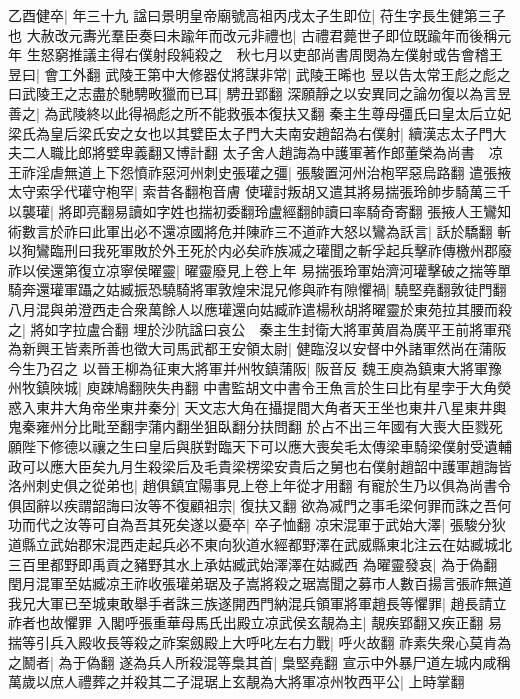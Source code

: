 乙酉健卒|{
	年三十九}
諡曰景明皇帝廟號高祖丙戌太子生即位|{
	苻生字長生健第三子也}
大赦改元夀光羣臣奏曰未踰年而改元非禮也|{
	古禮君薨世子即位既踰年而後稱元年}
生怒窮推議主得右僕射段純殺之　秋七月以吏部尚書周閔為左僕射或告會稽王昱曰|{
	會工外翻}
武陵王第中大修器仗將謀非常|{
	武陵王晞也}
昱以告太常王彪之彪之曰武陵王之志盡於馳騁畋獵而已耳|{
	騁丑郢翻}
深願靜之以安異同之論勿復以為言昱善之|{
	為武陵終以此得禍彪之所不能救張本復扶又翻}
秦主生尊母彊氏曰皇太后立妃梁氏為皇后梁氏安之女也以其嬖臣太子門大夫南安趙韶為右僕射|{
	續漢志太子門大夫二人職比郎將嬖卑義翻又博計翻}
太子舍人趙誨為中護軍著作郎董榮為尚書　凉王祚淫虐無道上下怨憤祚惡河州刺史張瓘之彊|{
	張駿置河州治枹罕惡烏路翻}
遣張掖太守索孚代瓘守枹罕|{
	索昔各翻枹音膚}
使瓘討叛胡又遣其將易揣張玲帥步騎萬三千以襲瓘|{
	將即亮翻易讀如字姓也揣初委翻玲盧經翻帥讀曰率騎奇寄翻}
張掖人王鸞知術數言於祚曰此軍出必不還凉國將危并陳祚三不道祚大怒以鸞為訞言|{
	訞於驕翻}
斬以狥鸞臨刑曰我死軍敗於外王死於内必矣祚族㓕之瓘聞之斬孚起兵擊祚傳檄州郡廢祚以侯還第復立凉寧侯曜靈|{
	曜靈廢見上卷上年}
易揣張玲軍始濟河瓘擊破之揣等單騎奔還瓘軍躡之姑臧振恐驍騎將軍敦煌宋混兄修與祚有隙懼禍|{
	驍堅堯翻敦徒門翻}
八月混與弟澄西走合衆萬餘人以應瓘還向姑臧祚遣楊秋胡將曜靈於東苑拉其腰而殺之|{
	將如字拉盧合翻}
埋於沙阬諡曰哀公　秦主生封衛大將軍黄眉為廣平王前將軍飛為新興王皆素所善也徵大司馬武都王安領太尉|{
	健臨沒以安督中外諸軍然尚在蒲阪今生乃召之}
以晉王柳為征東大將軍并州牧鎮蒲阪|{
	阪音反}
魏王庾為鎮東大將軍豫州牧鎮陜城|{
	庾踈鳩翻陜失冉翻}
中書監胡文中書令王魚言於生曰比有星孛于大角熒惑入東井大角帝坐東井秦分|{
	天文志大角在攝提間大角者天王坐也東井八星東井輿鬼秦雍州分比毗至翻孛蒲内翻坐狙臥翻分扶問翻}
於占不出三年國有大喪大臣戮死願陛下修德以禳之生曰皇后與朕對臨天下可以應大喪矣毛太傳梁車騎梁僕射受遺輔政可以應大臣矣九月生殺梁后及毛貴梁楞梁安貴后之舅也右僕射趙韶中護軍趙誨皆洛州刺史俱之從弟也|{
	趙俱鎮宜陽事見上卷上年從才用翻}
有寵於生乃以俱為尚書令俱固辭以疾謂韶誨曰汝等不復顧祖宗|{
	復扶又翻}
欲為㓕門之事毛梁何罪而誅之吾何功而代之汝等可自為吾其死矣遂以憂卒|{
	卒子恤翻}
凉宋混軍于武始大澤|{
	張駿分狄道縣立武始郡宋混西走起兵必不東向狄道水經都野澤在武威縣東北注云在姑臧城北三百里都野即禹貢之豬野其水上承姑臧武始澤澤在姑臧西}
為曜靈發哀|{
	為于偽翻}
閏月混軍至姑臧凉王祚收張瓘弟琚及子嵩將殺之琚嵩聞之募市人數百揚言張祚無道我兄大軍已至城東敢舉手者誅三族遂開西門納混兵領軍將軍趙長等懼罪|{
	趙長請立祚者也故懼罪}
入閣呼張重華母馬氏出殿立凉武侯玄靚為主|{
	靚疾郢翻又疾正翻}
易揣等引兵入殿收長等殺之祚案劔殿上大呼叱左右力戰|{
	呼火故翻}
祚素失衆心莫肯為之鬭者|{
	為于偽翻}
遂為兵人所殺混等梟其首|{
	梟堅堯翻}
宣示中外暴尸道左城内咸稱萬歲以庶人禮葬之并殺其二子混琚上玄靚為大將軍凉州牧西平公|{
	上時掌翻}
